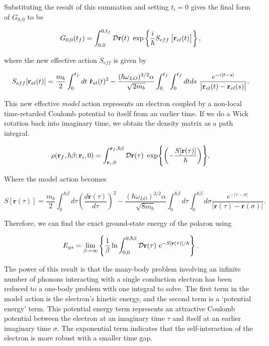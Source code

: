 Substituting the result of this summation and setting $t_i = 0$  gives the final form of $G_{0,0}$ to be

\begin{equation}
    G_{0,0}(t_f) = \int^{0, t_f}_{0, 0} \mathcal{D}\vb{r}(t)\ \exp\left\{ \frac{i}{\hbar} S_{eff} \left[\vb{r}_{el}(t)\right] \right\},
\end{equation}

where the new effective action $S_{eff}$ is given by

\begin{equation}
     S_{eff}[\vb{r}_{el}(t)] = \frac{m_b}{2} \int^{t_f}_{0} dt\ \vb{\dot{r}}_{el}(t)^2 -\frac{ (\hbar \omega_{LO})^{3/2} \alpha}{\sqrt{2 m_b}} \int_{0}^{t_f} \int_{0}^{t_f} dt ds\ \frac{e^{-i\abs{t-s}}}{\abs{\vb{r}_{el}(t) - \vb{r}_{el}(s)}}.
\end{equation}

This new effective \emph{model} action represents an electron coupled by a non-local time-retarded Coulomb potential to itself from an earlier time. If we do a Wick rotation back into imaginary time, we obtain the density matrix as a path integral.

\begin{equation}
    \rho(\vb{r}_{f}, \hbar\beta; \vb{r}_{i}, 0) = \int_{\vb{r}_i, 0}^{\vb{r}_f, \hbar\beta} \mathcal{D} \vb{r}(\tau)\ \exp{\left(-\frac{S[\mathbf{r}(\tau)]}{\hbar}\right)},
\label{eqn:path_density}
\end{equation}

Where the model action becomes

\begin{equation}
    S[\mathbf{r}(\tau)] = \frac{m_b}{2}\int^{\hbar\beta}_0 d\tau \left(\frac{d\mathbf{r}(\tau)}{d\tau}\right)^2 - \frac{ (\hbar \omega_{LO})^{3/2} \alpha}{\sqrt{8 m_b}} \int^{\hbar\beta}_0 d\tau \int^{\hbar\beta}_0 d\sigma \frac{e^{-|\tau - \sigma|}}{|\mathbf{r}(\tau) - \mathbf{r}(\sigma)|} .
\label{eqn:athermal_model_action}
\end{equation}

Therefore, we can find the exact ground-state energy of the polaron using

\begin{equation}
    E_{gs} = \lim_{\beta \to \infty} \left\{ \frac{1}{\beta} \ln \int_{0, 0}^{0, \hbar\beta} \mathcal{D}\vb{r}(\tau)\ e^{-S[\vb{r}(\tau)]/\hbar} \right\}.
\end{equation}

The power of this result is that the many-body problem involving an infinite number of phonons interacting with a single conduction electron has been reduced to a one-body problem with one integral to solve. The first term in the model action is the electron's kinetic energy, and the second term is a `potential energy' term. This potential energy term represents an attractive Coulomb potential between the electron at an imaginary time $\tau$ and itself at an earlier imaginary time $\sigma$. The exponential term indicates that the self-interaction of the electron is more robust with a smaller time gap.

